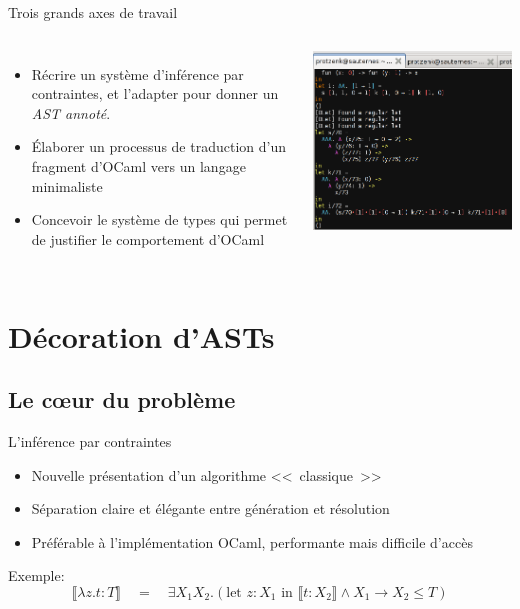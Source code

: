 \documentclass[final]{beamer}
\begin{document}
\begin{frame}{Trois grands axes de travail}
  \begin{columns}
      \begin{itemize}
        \item Récrire un système d'inférence par contraintes, et l'adapter pour
          donner un \emph{AST annoté}.
        \item Élaborer un processus de traduction d'un fragment d'OCaml vers un
          langage minimaliste
        \item Concevoir le système de types qui permet de justifier le comportement
          d'OCaml
      \end{itemize}
      \includegraphics[width=\columnwidth]{screen1.png}
  \end{columns}
\end{frame}

\section{Décoration d'ASTs}

\subsection{Le cœur du problème}

\begin{frame}{L'inférence par contraintes}
  \begin{itemize}
    \item Nouvelle présentation d'un algorithme <<~classique~>>
    \item Séparation claire et élégante entre génération et résolution
    \item Préférable à l'implémentation OCaml, performante mais difficile
      d'accès
  \end{itemize}
  Exemple: $$
  \llbracket \lambda z.t : T \rrbracket \quad = \quad
  \exists X_1 X_2.\left(\text{let }z: X_1 \text{ in } \llbracket t: X_2
  \rrbracket \wedge X_1 \to X_2 \leq T\right)
  $$
\end{frame}
\end{document}
